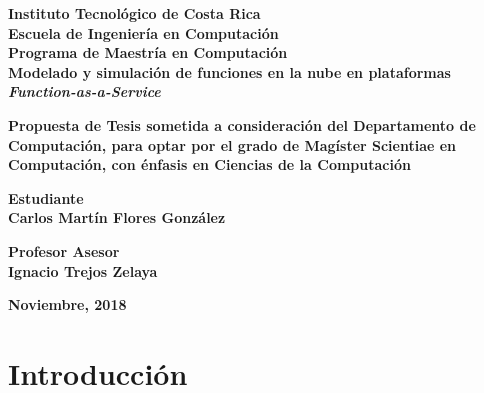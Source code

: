 \documentclass[12pt, twoside]{report}
\begin{document}
\thispagestyle{plain}
\begin{titlepage}
	\begin{center}
        {\fontsize{24}{28}\selectfont \textbf{Instituto Tecnológico de Costa Rica}\\}
        \vspace{1cm}
        {\fontsize{20}{24}\selectfont \textbf{Escuela de Ingeniería en Computación}\\}
        {\fontsize{18}{22}\selectfont \textbf{Programa de Maestría en Computación}\\}
        \vspace{2cm}
        {\fontsize{20}{24}\selectfont \textbf{Modelado y simulación de funciones en la nube en plataformas \textit{Function-as-a-Service}}}    
    
    
        \vspace{2cm}
        {\fontsize{14}{17}\selectfont \textbf{Propuesta de Tesis sometida a consideración del Departamento de Computación, para optar por el grado de Magíster Scientiae en Computación, con énfasis en Ciencias de la Computación
}}
        
       \vspace{1.5cm}
       {\fontsize{14}{17}\selectfont \textbf{Estudiante\\ Carlos Martín Flores González}} 
       
       \vspace{1cm}
       {\fontsize{14}{17}\selectfont \textbf{Profesor Asesor\\ Ignacio Trejos Zelaya}}
       
       \vspace{1.5cm}
       {\fontsize{14}{17}\selectfont \textbf{Noviembre, 2018}}                       
        
    \end{center}
\end{titlepage}

{} 
\renewcommand*\contentsname{Indice}
\tableofcontents
\listoffigures
\listoftables

\chapter{Introducción}

\end{document}
